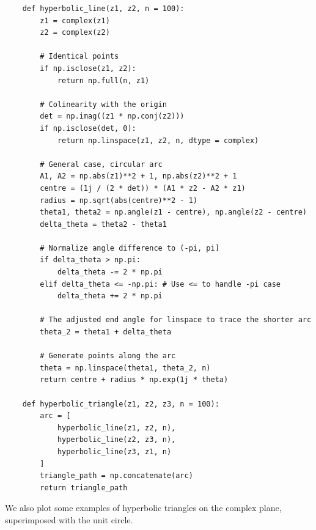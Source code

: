 \documentclass{article}
\begin{document}
\begin{verbatim}
    def hyperbolic_line(z1, z2, n = 100):
        z1 = complex(z1)
        z2 = complex(z2)
    
        # Identical points
        if np.isclose(z1, z2):
            return np.full(n, z1)
    
        # Colinearity with the origin
        det = np.imag((z1 * np.conj(z2)))
        if np.isclose(det, 0):
            return np.linspace(z1, z2, n, dtype = complex)
            
        # General case, circular arc
        A1, A2 = np.abs(z1)**2 + 1, np.abs(z2)**2 + 1
        centre = (1j / (2 * det)) * (A1 * z2 - A2 * z1)
        radius = np.sqrt(abs(centre)**2 - 1)
        theta1, theta2 = np.angle(z1 - centre), np.angle(z2 - centre)
        delta_theta = theta2 - theta1
    
        # Normalize angle difference to (-pi, pi]
        if delta_theta > np.pi:
            delta_theta -= 2 * np.pi
        elif delta_theta <= -np.pi: # Use <= to handle -pi case 
            delta_theta += 2 * np.pi
    
        # The adjusted end angle for linspace to trace the shorter arc
        theta_2 = theta1 + delta_theta
    
        # Generate points along the arc
        theta = np.linspace(theta1, theta_2, n)
        return centre + radius * np.exp(1j * theta)

    def hyperbolic_triangle(z1, z2, z3, n = 100):
        arc = [
            hyperbolic_line(z1, z2, n), 
            hyperbolic_line(z2, z3, n), 
            hyperbolic_line(z3, z1, n)
        ]
        triangle_path = np.concatenate(arc)
        return triangle_path
\end{verbatim}

We also plot some examples of hyperbolic triangles on the complex plane, superimposed with the unit circle. 
\end{document}
